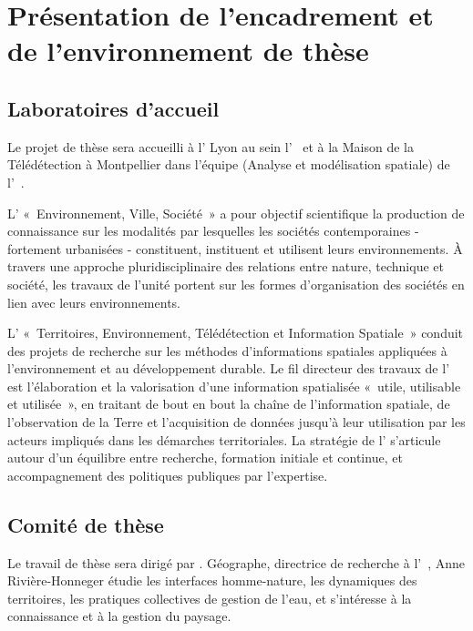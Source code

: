 \section[environnement]
{Présentation de l'encadrement et de l'environnement de thèse}

\subsection{Laboratoires d'accueil}

Le projet de thèse sera accueilli à l'{\ENS} Lyon au sein l'{\UMR\ \EVS} et à la Maison de la Télédétection
à Montpellier dans l'équipe {\AMoS} (Analyse et modélisation spatiale) de l'{\UMR\ \TETIS}.

L'{\UMR} « Environnement, Ville, Société » a pour objectif scientifique
la production de connaissance sur les modalités
par lesquelles les sociétés contemporaines - fortement urbanisées -
constituent, instituent et utilisent leurs environnements.
À travers une approche pluridisciplinaire des relations entre nature,
technique et société, les travaux de l'unité
portent sur les formes d'organisation des sociétés en lien avec leurs environnements.

L'{\UMR} « Territoires, Environnement, Télédétection et Information Spatiale »
conduit des projets de recherche
sur les méthodes d'informations spatiales appliquées à l'environnement et
au développement durable.
Le fil directeur des travaux de l'{\UMR} est l'élaboration et la valorisation
d'une information spatialisée « utile, utilisable et utilisée »,
en traitant de bout en bout la chaîne de l'information spatiale,
de l'observation de la Terre et
l'acquisition de données jusqu'à leur utilisation par les acteurs impliqués
dans les démarches territoriales.
La stratégie de l'{\UMR} s'articule autour d'un équilibre entre recherche,
formation initiale et continue,
et accompagnement des politiques publiques par l'expertise.


\subsection{Comité de thèse}

Le travail de thèse sera dirigé par . Géographe, directrice de recherche {\CNRS} à l'{\UMR\ \EVS},
Anne Rivière-Honneger étudie les interfaces homme-nature, les dynamiques des territoires,
les pratiques collectives de gestion de l'eau, et s'intéresse à la connaissance et à la gestion du paysage.

